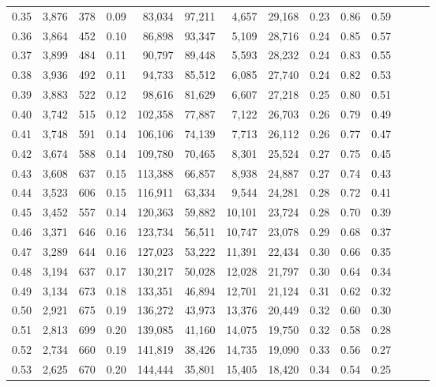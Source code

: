 \begin{tabular}{rrrrrrrrrrrrrr}
0.35 &  3,876 &  378 &  0.09 &   83,034 &   97,211 &   4,657 &  29,168 &  0.23 &  0.86 &      0.59 \\
0.36 &  3,864 &  452 &  0.10 &   86,898 &   93,347 &   5,109 &  28,716 &  0.24 &  0.85 &      0.57 \\
0.37 &  3,899 &  484 &  0.11 &   90,797 &   89,448 &   5,593 &  28,232 &  0.24 &  0.83 &      0.55 \\
0.38 &  3,936 &  492 &  0.11 &   94,733 &   85,512 &   6,085 &  27,740 &  0.24 &  0.82 &      0.53 \\
0.39 &  3,883 &  522 &  0.12 &   98,616 &   81,629 &   6,607 &  27,218 &  0.25 &  0.80 &      0.51 \\
0.40 &  3,742 &  515 &  0.12 &  102,358 &   77,887 &   7,122 &  26,703 &  0.26 &  0.79 &      0.49 \\
0.41 &  3,748 &  591 &  0.14 &  106,106 &   74,139 &   7,713 &  26,112 &  0.26 &  0.77 &      0.47 \\
0.42 &  3,674 &  588 &  0.14 &  109,780 &   70,465 &   8,301 &  25,524 &  0.27 &  0.75 &      0.45 \\
0.43 &  3,608 &  637 &  0.15 &  113,388 &   66,857 &   8,938 &  24,887 &  0.27 &  0.74 &      0.43 \\
0.44 &  3,523 &  606 &  0.15 &  116,911 &   63,334 &   9,544 &  24,281 &  0.28 &  0.72 &      0.41 \\
0.45 &  3,452 &  557 &  0.14 &  120,363 &   59,882 &  10,101 &  23,724 &  0.28 &  0.70 &      0.39 \\
0.46 &  3,371 &  646 &  0.16 &  123,734 &   56,511 &  10,747 &  23,078 &  0.29 &  0.68 &      0.37 \\
0.47 &  3,289 &  644 &  0.16 &  127,023 &   53,222 &  11,391 &  22,434 &  0.30 &  0.66 &      0.35 \\
0.48 &  3,194 &  637 &  0.17 &  130,217 &   50,028 &  12,028 &  21,797 &  0.30 &  0.64 &      0.34 \\
0.49 &  3,134 &  673 &  0.18 &  133,351 &   46,894 &  12,701 &  21,124 &  0.31 &  0.62 &      0.32 \\
0.50 &  2,921 &  675 &  0.19 &  136,272 &   43,973 &  13,376 &  20,449 &  0.32 &  0.60 &      0.30 \\
0.51 &  2,813 &  699 &  0.20 &  139,085 &   41,160 &  14,075 &  19,750 &  0.32 &  0.58 &      0.28 \\
0.52 &  2,734 &  660 &  0.19 &  141,819 &   38,426 &  14,735 &  19,090 &  0.33 &  0.56 &      0.27 \\
0.53 &  2,625 &  670 &  0.20 &  144,444 &   35,801 &  15,405 &  18,420 &  0.34 &  0.54 &      0.25 \\

\end{tabular}
